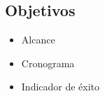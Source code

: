 \subsection{Objetivos}
\begin{itemize}
    \item Alcance
    \item Cronograma 
    \item Indicador de éxito
\end{itemize}